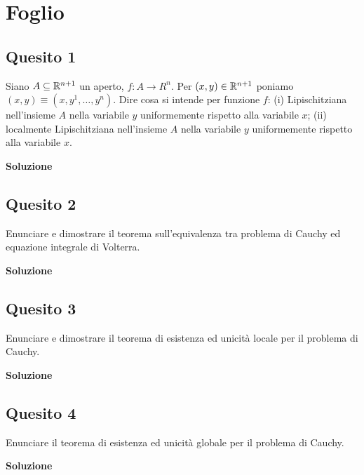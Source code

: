 \chapter{Foglio \ \thechapter}


\section*{Quesito 1}
Siano $A\subseteq\mathbb{R}^{n+1}$ un aperto, $f : A \to R^n$. Per $(x, y) \in \mathbb{R}^{n+1}$ poniamo
$(x, y) \equiv (x, y^1, \dots , y^n)$. Dire cosa si intende per funzione $f$: (i) Lipischitziana nell'insieme
$A$ nella variabile $y$ uniformemente rispetto alla variabile $x$; (ii) localmente Lipischitziana
nell'insieme $A$ nella variabile $y$ uniformemente rispetto alla variabile $x$.


\medskip
\begin{large}
\textbf{Soluzione}
\end{large}


\section*{Quesito 2}
Enunciare e dimostrare il teorema sull'equivalenza tra problema di Cauchy ed
equazione integrale di Volterra.


\medskip
\begin{large}
\textbf{Soluzione}
\end{large}


\section*{Quesito 3}
Enunciare e dimostrare il teorema di esistenza ed unicità locale per il problema
di Cauchy.


\medskip
\begin{large}
\textbf{Soluzione}
\end{large}


\section*{Quesito 4}
Enunciare il teorema di esistenza ed unicità globale per il problema di Cauchy.

\medskip
\begin{large}
\textbf{Soluzione}
\end{large}


